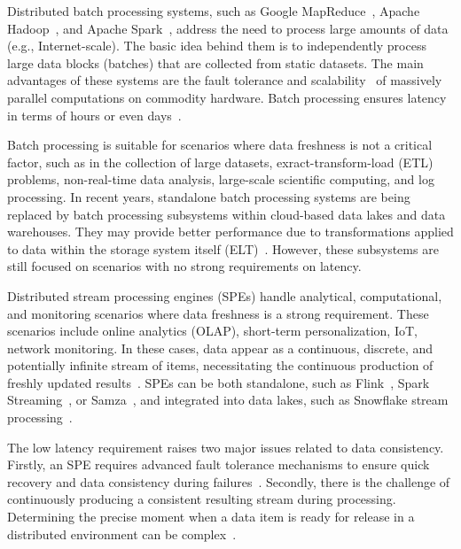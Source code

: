 Distributed batch processing systems, such as Google MapReduce~\cite{Dean:2008:MSD:1327452.1327492}, Apache Hadoop~\cite{hadoop2009hadoop}, and Apache Spark~\cite{Zaharia:2016:ASU:3013530.2934664}, address the need to process large amounts of data (e.g., Internet-scale). The basic idea behind them is to independently process large data blocks (batches) that are collected from static datasets. The main advantages of these systems are the fault tolerance and scalability~\cite{borthakur2011apache} of massively parallel computations on commodity hardware. Batch processing ensures latency in terms of hours or even days~\cite{carbone2015apache, chang2014hawq, sun2023survey}. 

Batch processing is suitable for scenarios where data freshness is not a critical factor, such as in the collection of large datasets, exract-transform-load (ETL) problems, non-real-time data analysis, large-scale scientific computing, and log processing. In recent years, standalone batch processing systems are being replaced by batch processing subsystems within cloud-based data lakes and data warehouses. They may provide better performance due to transformations applied to data within the storage system itself (ELT)~\cite{stonebraker2024goes, akidau2024continuous}. However, these subsystems are still focused on scenarios with no strong requirements on latency. 

Distributed stream processing engines (SPEs) handle analytical, computational, and monitoring scenarios where data freshness is a strong requirement. These scenarios include online analytics (OLAP), short-term personalization, IoT, network monitoring. In these cases, data appear as a continuous, discrete, and potentially infinite stream of items, necessitating the continuous production of freshly updated results~\cite{fragkoulis2024survey, diro2024anomaly}. SPEs can be both standalone, such as Flink~\cite{carbone2015apache}, Spark Streaming~\cite{Zaharia:2012:DSE:2342763.2342773}, or Samza~\cite{Noghabi:2017:SSS:3137765.3137770}, and integrated into data lakes, such as Snowflake stream processing~\cite{akidau2024continuous}.

The low latency requirement raises two major issues related to data consistency. Firstly, an SPE requires advanced fault tolerance mechanisms to ensure quick recovery and data consistency during failures~\cite{Wang:2019:LSF:3341301.3359653, akidau2015streaming}. Secondly, there is the challenge of continuously producing a consistent resulting stream during processing. Determining the precise moment when a data item is ready for release in a distributed environment can be complex~\cite{Tucker:2003:EPS:776752.776780, DBLP:journals/pvldb/BegoliACHKKMS21}.

